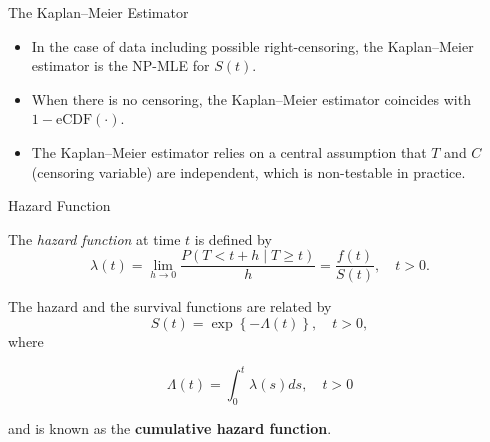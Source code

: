\documentclass[12pt,t]{beamer}
\begin{document}
\begin{frame}[c]{The Kaplan--Meier Estimator}

\begin{center}
\begin{itemize}
  \itemsep12pt
  \item In the case of data including possible right-censoring, the Kaplan--Meier
    estimator is the NP-MLE for $S(t)$.
  \item When there is no censoring, the Kaplan--Meier estimator coincides with
    $1 - \text{eCDF}(\cdot)$.
  \item The Kaplan--Meier estimator relies on a central assumption that $T$ and
    $C$ (censoring variable) are independent, which is non-testable in practice.
\end{itemize}
\end{center}


\end{frame}


\begin{frame}[c]{Hazard Function}

The \textit{hazard function} at time $t$ is defined by
$$\lambda(t) = \lim_{h \to 0}
 \frac{P\left(T< t+h \mid T\geq t \right)}{h}= \frac{f(t)}{S(t)}, \quad t > 0.$$

The hazard and the survival functions are related by
$$S(t) = \exp\left\{-\Lambda(t)\right\}, \quad t > 0,$$
where

$$\Lambda(t) = \int_0^t \lambda(s) ds, \quad t > 0$$

and is known as the \textbf{cumulative hazard function}.

\note{
}
\end{frame}

\end{document}
